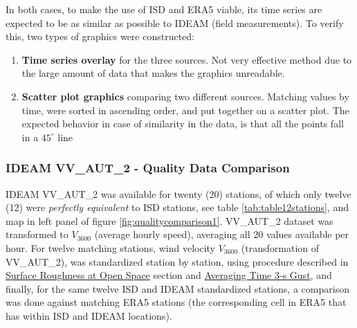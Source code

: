 \documentclass[12pt,oneside]{reedthesis}
\begin{document}
In both cases, to make the use of ISD and ERA5 viable, its time series are expected to be as similar as possible to IDEAM (field measurements). To verify this, two types of graphics were constructed:
\begin{enumerate}
\def\labelenumi{\arabic{enumi}.}
\item
  \textbf{Time series overlay} for the three sources. Not very effective method due to the large amount of data that makes the graphics unreadable.
\item
  \textbf{Scatter plot graphics} comparing two different sources. Matching values by time, were sorted in ascending order, and put together on a scatter plot. The expected behavior in case of similarity in the data, is that all the points fall in a \(45^\circ\) line
\end{enumerate}
\hypertarget{ideam-vv_aut_2---quality-data-comparison}{%
\subsubsection{IDEAM VV\_AUT\_2 - Quality Data Comparison}\label{ideam-vv_aut_2---quality-data-comparison}}

IDEAM VV\_AUT\_2 was available for twenty (20) stations, of which only twelve (12) were \emph{perfectly equivalent} to ISD stations, see table \ref{tab:table12stations}, and map in left panel of figure \ref{fig:qualitycomparison1}. VV\_AUT\_2 dataset was transformed to \(V_{3600}\) (average hourly speed), averaging all 20 values available per hour. For twelve matching stations, wind velocity \(V_{3600}\) (transformation of VV\_AUT\_2), was standardized station by station, using procedure described in \protect\hyperlink{rmd-roughness}{Surface Roughness at Open Space} section and \protect\hyperlink{rmd-gust}{Averaging Time 3-s Gust}, and finally, for the same twelve ISD and IDEAM standardized stations, a comparison was done against matching ERA5 stations (the corresponding cell in ERA5 that has within ISD and IDEAM locations).
\end{document}
